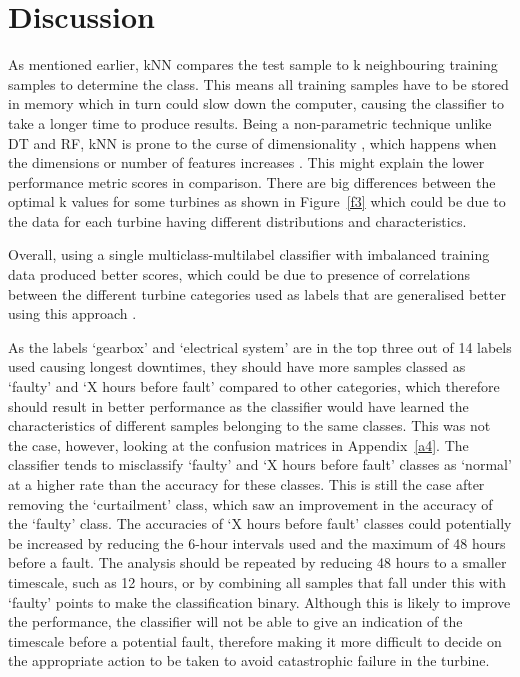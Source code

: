 
\chapter{Discussion}\label{c4}

As mentioned earlier, kNN compares the test sample to k neighbouring training samples to determine the class. This means all training samples have to be stored in memory \cite{Gutie} which in turn could slow down the computer, causing the classifier to take a longer time to produce results. Being a non-parametric technique \cite{16N} unlike DT and RF, kNN is prone to the curse of dimensionality \cite{Gutie}, which happens when the dimensions or number of features increases \cite{Distr}. This might explain the lower performance metric scores in comparison. There are big differences between the optimal k values for some turbines as shown in Figure~\ref{f3} which could be due to the data for each turbine having different distributions and characteristics.

Overall, using a single multiclass-multilabel classifier with imbalanced training data produced better scores, which could be due to presence of correlations between the different turbine categories used as labels that are generalised better using this approach \cite{110}.

As the labels `gearbox' and `electrical system' are in the top three out of 14 labels used causing longest downtimes, they should have more samples classed as `faulty' and `X hours before fault' compared to other categories, which therefore should result in better performance as the classifier would have learned the characteristics of different samples belonging to the same classes. This was not the case, however, looking at the confusion matrices in Appendix~\ref{a4}. The classifier tends to misclassify `faulty' and `X hours before fault' classes as `normal' at a higher rate than the accuracy for these classes. This is still the case after removing the `curtailment' class, which saw an improvement in the accuracy of the `faulty' class. The accuracies of `X hours before fault' classes could potentially be increased by reducing the 6-hour intervals used and the maximum of 48 hours before a fault. The analysis should be repeated by reducing 48 hours to a smaller timescale, such as 12 hours, or by combining all samples that fall under this with `faulty' points to make the classification binary. Although this is likely to improve the performance, the classifier will not be able to give an indication of the timescale before a potential fault, therefore making it more difficult to decide on the appropriate action to be taken to avoid catastrophic failure in the turbine.

